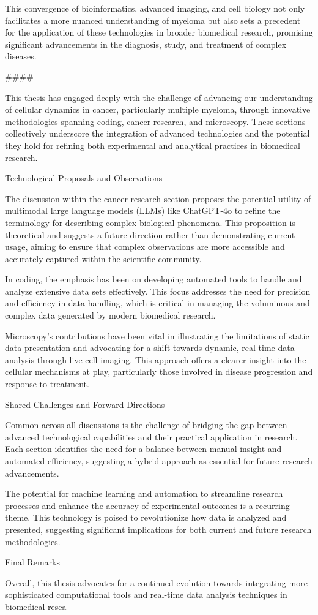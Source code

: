 This convergence of bioinformatics, advanced imaging, and cell biology not only
facilitates a more nuanced understanding of myeloma but also sets a precedent
for the application of these technologies in broader biomedical research,
promising significant advancements in the diagnosis, study, and treatment of
complex diseases.




####



This thesis has engaged deeply with the challenge of advancing our understanding of cellular dynamics in cancer, particularly multiple myeloma, through innovative methodologies spanning coding, cancer research, and microscopy. These sections collectively underscore the integration of advanced technologies and the potential they hold for refining both experimental and analytical practices in biomedical research.

Technological Proposals and Observations

The discussion within the cancer research section proposes the potential utility of multimodal large language models (LLMs) like ChatGPT-4o to refine the terminology for describing complex biological phenomena. This proposition is theoretical and suggests a future direction rather than demonstrating current usage, aiming to ensure that complex observations are more accessible and accurately captured within the scientific community.

In coding, the emphasis has been on developing automated tools to handle and analyze extensive data sets effectively. This focus addresses the need for precision and efficiency in data handling, which is critical in managing the voluminous and complex data generated by modern biomedical research.

Microscopy’s contributions have been vital in illustrating the limitations of static data presentation and advocating for a shift towards dynamic, real-time data analysis through live-cell imaging. This approach offers a clearer insight into the cellular mechanisms at play, particularly those involved in disease progression and response to treatment.

Shared Challenges and Forward Directions

Common across all discussions is the challenge of bridging the gap between advanced technological capabilities and their practical application in research. Each section identifies the need for a balance between manual insight and automated efficiency, suggesting a hybrid approach as essential for future research advancements.

The potential for machine learning and automation to streamline research processes and enhance the accuracy of experimental outcomes is a recurring theme. This technology is poised to revolutionize how data is analyzed and presented, suggesting significant implications for both current and future research methodologies.

Final Remarks

Overall, this thesis advocates for a continued evolution towards integrating more sophisticated computational tools and real-time data analysis techniques in biomedical resea